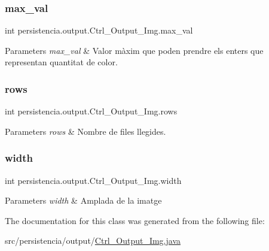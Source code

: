 \subsubsection{\texorpdfstring{max\+\_\+val}{max\_val}}
{\footnotesize\ttfamily int persistencia.\+output.\+Ctrl\+\_\+\+Output\+\_\+\+Img.\+max\+\_\+val\hspace{0.3cm}{\ttfamily [package]}}


\begin{DoxyParams}{Parameters}
{\em max\+\_\+val} & Valor màxim que poden prendre els enters que representan quantitat de color. \\
\hline
\end{DoxyParams}
\mbox{\label{classpersistencia_1_1output_1_1Ctrl__Output__Img_a586ee8128a26b6786471e040a705bdbc}} 
\subsubsection{\texorpdfstring{rows}{rows}}
{\footnotesize\ttfamily int persistencia.\+output.\+Ctrl\+\_\+\+Output\+\_\+\+Img.\+rows\hspace{0.3cm}{\ttfamily [package]}}


\begin{DoxyParams}{Parameters}
{\em rows} & Nombre de files llegides. \\
\hline
\end{DoxyParams}
\mbox{\label{classpersistencia_1_1output_1_1Ctrl__Output__Img_ae4a01ec459078cece4815d2fe7db8a64}} 
\subsubsection{\texorpdfstring{width}{width}}
{\footnotesize\ttfamily int persistencia.\+output.\+Ctrl\+\_\+\+Output\+\_\+\+Img.\+width\hspace{0.3cm}{\ttfamily [package]}}


\begin{DoxyParams}{Parameters}
{\em width} & Amplada de la imatge \\
\hline
\end{DoxyParams}


The documentation for this class was generated from the following file\+:\begin{DoxyCompactItemize}
\item 
src/persistencia/output/\hyperlink{Ctrl__Output__Img_8java}{Ctrl\+\_\+\+Output\+\_\+\+Img.\+java}\end{DoxyCompactItemize}
